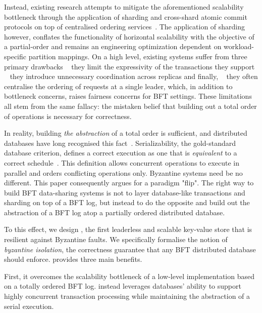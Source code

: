 Instead, existing research attempts to mitigate the aforementioned scalability bottleneck through the application of sharding and cross-shard atomic commit protocols on top of centralised ordering services~\cite{kokoris2018omniledger,al2017chainspace,padilha2016callinicos}. The application of sharding however, conflates the functionality of horizontal scalability with the objective of a partial-order and remains an engineering optimization dependent on workload-specific partition mappings.
On a high level, existing systems suffer from three primary drawbacks \one ~ they limit the expressivity of the transactions they support  \two ~ they introduce unnecessary coordination across replicas and finally,
\three ~ they often centralise the ordering of requests at a single leader, which, in addition to bottleneck concerns, raises fairness concerns for BFT settings. These limitations all stem from the same fallacy: the mistaken belief that building out a total order of operations is necessary for correctness. 
\fi



 
In reality, building \textit{the abstraction} of a total order is sufficient, and distributed databases have long recognised this fact~\cite{crooks2018obladi,bernstein1979fas,Papadimitriou1979serializability,adya99weakconsis}.  Serializability, the gold-standard database criterion, defines a correct execution as one that is \textit{equivalent} to a correct schedule~\cite{bernstein1979fas,Papadimitriou1979serializability,bernstein1979fas}. This definition allows concurrent operations to execute in parallel and orders conflicting operations only.  Byzantine systems need be no different. This paper consequently argues for a paradigm "flip". The
right way to build BFT data-sharing systems is not to layer database-like transactions and sharding on top of a BFT log, but instead to do the opposite and build out the abstraction of a BFT log atop a partially ordered distributed database.

To this effect, we design \sys{}, the first leaderless and scalable key-value store that is resilient against
Byzantine faults. We specifically formalise the notion of \textit{byzantine isolation}, the correctness
guarantee that any BFT distributed database should enforce.  \sys{} provides three main benefits.

 First, it overcomes the scalability bottleneck of a low-level
implementation based on a totally ordered BFT log. \sys instead leverages databases' ability to support highly concurrent transaction
processing while maintaining the abstraction
of a serial execution.

